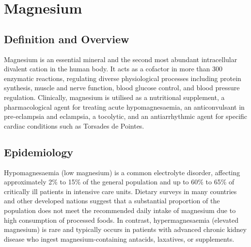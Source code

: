 \chapter{Magnesium}

\section*{Definition and Overview}
Magnesium is an essential mineral and the second most abundant intracellular divalent cation in the human body. It acts as a cofactor in more than 300 enzymatic reactions, regulating diverse physiological processes including protein synthesis, muscle and nerve function, blood glucose control, and blood pressure regulation. Clinically, magnesium is utilised as a nutritional supplement, a pharmacological agent for treating acute hypomagnesaemia, an anticonvulsant in pre-eclampsia and eclampsia, a tocolytic, and an antiarrhythmic agent for specific cardiac conditions such as Torsades de Pointes.

\section*{Epidemiology}
Hypomagnesaemia (low magnesium) is a common electrolyte disorder, affecting approximately 2\% to 15\% of the general population and up to 60\% to 65\% of critically ill patients in intensive care units. Dietary surveys in many countries and other developed nations suggest that a substantial proportion of the population does not meet the recommended daily intake of magnesium due to high consumption of processed foods. In contrast, hypermagnesaemia (elevated magnesium) is rare and typically occurs in patients with advanced chronic kidney disease who ingest magnesium-containing antacids, laxatives, or supplements.

